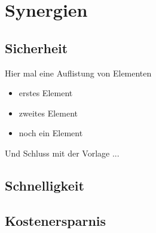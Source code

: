 \chapter{Synergien}
\section{Sicherheit}

Hier mal eine Auflistung von Elementen
\begin{itemize}
 \item erstes Element
 \item zweites Element
 \item noch ein Element
\end{itemize}

Und Schluss mit der Vorlage ...

\section{Schnelligkeit}

\section{Kostenersparnis}
